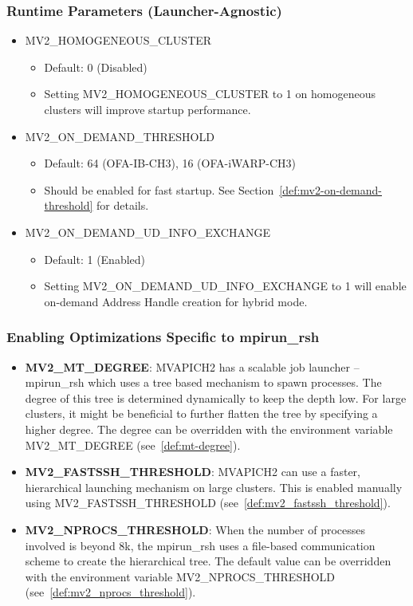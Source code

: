 \subsubsection{Runtime Parameters (Launcher-Agnostic)}

\begin{itemize}
\item MV2\_HOMOGENEOUS\_CLUSTER
    \begin{itemize}
        \item Default: 0 (Disabled)
        \item Setting MV2\_HOMOGENEOUS\_CLUSTER to 1 on homogeneous clusters
            will improve startup performance.
    \end{itemize}
\item MV2\_ON\_DEMAND\_THRESHOLD 
    \begin{itemize}
        \item Default: 64 (OFA-IB-CH3), 16 (OFA-iWARP-CH3)
        \item Should be enabled for fast startup. See
            Section~\ref{def:mv2-on-demand-threshold} for details.
    \end{itemize}
\item MV2\_ON\_DEMAND\_UD\_INFO\_EXCHANGE 
    \begin{itemize}
        \item Default: 1 (Enabled)
        \item Setting MV2\_ON\_DEMAND\_UD\_INFO\_EXCHANGE to 1 
            will enable on-demand Address Handle creation for hybrid mode.
    \end{itemize}
\end{itemize}

\subsubsection{Enabling Optimizations Specific to mpirun\_rsh}

\begin{itemize}
\item \textbf{MV2\_MT\_DEGREE}:
MVAPICH2 has a scalable job launcher -- mpirun\_rsh which uses a
tree based mechanism to spawn processes. The degree of this tree is
determined dynamically to keep the depth low. For large clusters, it might
be beneficial to further flatten the tree by specifying a higher degree. The
degree can be overridden with the environment variable MV2\_MT\_DEGREE (see~\ref{def:mt-degree}).

\item \textbf{MV2\_FASTSSH\_THRESHOLD}:
MVAPICH2 can use a faster, hierarchical launching mechanism on large
clusters. This is enabled manually using
MV2\_FASTSSH\_THRESHOLD (see~\ref{def:mv2_fastssh_threshold}).

\item \textbf{MV2\_NPROCS\_THRESHOLD}:
When the number of processes involved is beyond 8k, the mpirun\_rsh uses a
file-based communication scheme to create the hierarchical tree.  The default
value can be overridden with the environment variable MV2\_NPROCS\_THRESHOLD
 (see~\ref{def:mv2_nprocs_threshold}).
\end{itemize}

